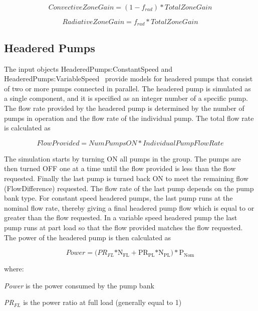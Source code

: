 \begin{equation}
ConvectiveZoneGain = \left( {1 - {f_{rad}}} \right)*TotalZoneGain
\end{equation}

\begin{equation}
RadiativeZoneGain = {f_{rad}}*TotalZoneGain
\end{equation}

\subsection{Headered Pumps}\label{headered-pumps}

The input objects HeaderedPumps:ConstantSpeed and HeaderedPumps:VariableSpeed ~provide models for headered pumps that consist of two or more pumps connected in parallel. The headered pump is simulated as a single component, and it is specified as an integer number of a specific pump. The flow rate provided by the headered pump is determined by the number of pumps in operation and the flow rate of the individual pump. The total flow rate is calculated as

\begin{equation}
FlowProvided = NumPumpsON*IndividualPumpFlowRate
\end{equation}

The simulation starts by turning ON all pumps in the group. The pumps are then turned OFF one at a time until the flow provided is less than the flow requested. Finally the last pump is turned back ON to meet the remaining flow (FlowDifference) requested. The flow rate of the last pump depends on the pump bank type. For constant speed headered pumps, the last pump runs at the nominal flow rate, thereby giving a final headered pump flow which is equal to or greater than the flow requested. In a variable speed headered pump the last pump runs at part load so that the flow provided matches the flow requested. The power of the headered pump is then calculated as

\begin{equation}
Power = (P{R_{FL}}{\mathrm{*N}}{}_{{\mathrm{FL}}} + {\mathrm{P}}{{\mathrm{R}}_{{\mathrm{PL}}}}{\mathrm{*}}{{\mathrm{N}}_{{\mathrm{PL}}}}{\mathrm{)*}}{{\mathrm{P}}_{{\mathrm{Nom}}}}{\mathrm{  }}
\end{equation}

where:

\emph{Power} is the power consumed by the pump bank

\emph{PR\(_{FL}\)} is the power ratio at full load (generally equal to 1)

